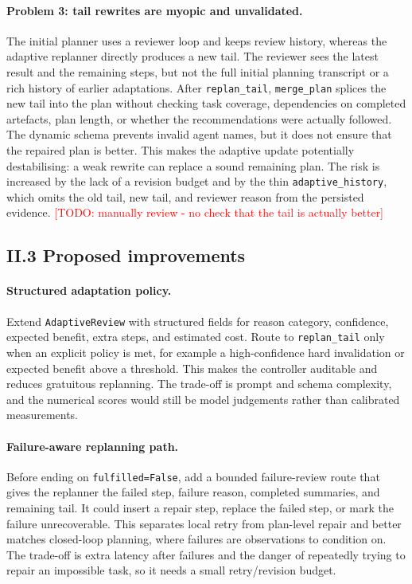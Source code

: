 \documentclass[11pt,a4paper]{article}
\newcommand{\code}[1]{\texttt{#1}}
\newcommand{\TODO}[1]{\textcolor{red}{[TODO: #1]}}
\begin{document}
\paragraph{Problem 3: tail rewrites are myopic and unvalidated.}
The initial planner uses a reviewer loop and keeps review history, whereas the adaptive replanner directly produces a new tail.  The reviewer sees the latest result and the remaining steps, but not the full initial planning transcript or a rich history of earlier adaptations.  After \code{replan\_tail}, \code{merge\_plan} splices the new tail into the plan without checking task coverage, dependencies on completed artefacts, plan length, or whether the recommendations were actually followed.  The dynamic schema prevents invalid agent names, but it does not ensure that the repaired plan is better.  This makes the adaptive update potentially destabilising: a weak rewrite can replace a sound remaining plan.  The risk is increased by the lack of a revision budget and by the thin \code{adaptive\_history}, which omits the old tail, new tail, and reviewer reason from the persisted evidence.
\TODO{manually review - no check that the tail is actually better}

\subsection*{II.3 Proposed improvements}

\paragraph{Structured adaptation policy.}
Extend \code{AdaptiveReview} with structured fields for reason category, confidence, expected benefit, extra steps, and estimated cost.  Route to \code{replan\_tail} only when an explicit policy is met, for example a high-confidence hard invalidation or expected benefit above a threshold.  This makes the controller auditable and reduces gratuitous replanning.  The trade-off is prompt and schema complexity, and the numerical scores would still be model judgements rather than calibrated measurements.

\paragraph{Failure-aware replanning path.}
Before ending on \code{fulfilled=False}, add a bounded failure-review route that gives the replanner the failed step, failure reason, completed summaries, and remaining tail.  It could insert a repair step, replace the failed step, or mark the failure unrecoverable.  This separates local retry from plan-level repair and better matches closed-loop planning, where failures are observations to condition on.  The trade-off is extra latency after failures and the danger of repeatedly trying to repair an impossible task, so it needs a small retry/revision budget.
\end{document}
